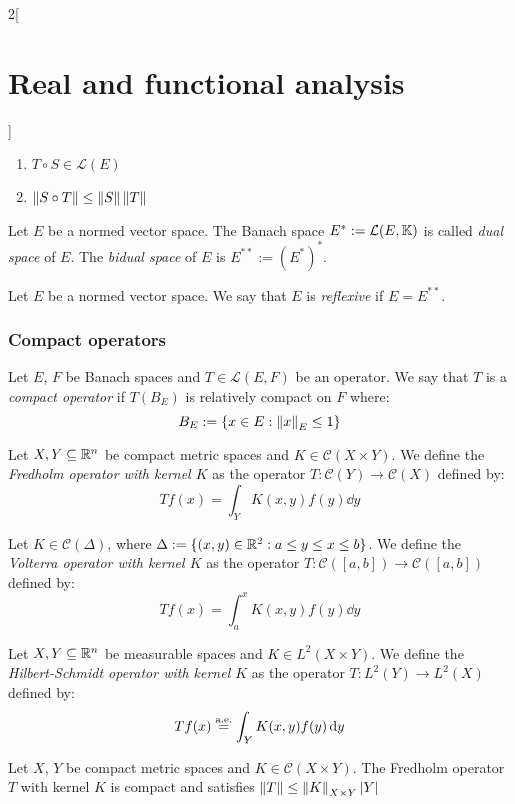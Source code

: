 \documentclass[../../../main_math.tex]{subfiles}
\begin{document}
\begin{multicols}{2}[\section{Real and functional analysis}]
\begin{definition}
    \begin{enumerate}
      \item $T\circ S\in\mathcal{L}(E)$
      \item $\left\|S\circ T\right\|\leq\left\|S\right\|\left\|T\right\|$
    \end{enumerate}
  \end{definition}
  \begin{definition}
    Let $E$ be a normed vector space. The Banach space $E^*:=\mathcal{L}(E,\mathbb{K})$ is called \emph{dual space} of $E$. The \emph{bidual space} of $E$ is $E^{**}:=(E^*)^*$.
  \end{definition}
  \begin{definition}
    Let $E$ be a normed vector space. We say that $E$ is \emph{reflexive} if $E=E^{**}$.
  \end{definition}
  \subsubsection{Compact operators}
  \begin{definition}
    Let $E$, $F$ be Banach spaces and $T\in\mathcal{L}(E,F)$ be an operator. We say that $T$ is a \emph{compact operator} if $T(B_E)$ is relatively compact on $F$ where: $$B_E:=\{x\in E:\left\|x\right\|_E\leq 1\}$$
  \end{definition}
  \begin{definition}
    Let $X,Y\subseteq \mathbb{R}^n$ be compact metric spaces and $K\in\mathcal{C}(X\times Y)$. We define the \emph{Fredholm operator with kernel $K$} as the operator $T:\mathcal{C}(Y)\rightarrow\mathcal{C}(X)$ defined by: $$Tf(x)=\int_YK(x,y)f(y)\dd{y}$$
  \end{definition}
  \begin{definition}
    Let $K\in\mathcal{C}(\Delta)$, where $\Delta:=\{(x,y)\in\mathbb{R}^2:a\leq y\leq x\leq b\}$. We define the \emph{Volterra operator with kernel $K$} as the operator $T:\mathcal{C}([a,b])\rightarrow\mathcal{C}([a,b])$ defined by: $$Tf(x)=\int_a^xK(x,y)f(y)\dd{y}$$
  \end{definition}
  \begin{definition}
    Let $X,Y\subseteq \mathbb{R}^n$ be measurable spaces and $K\in L^2(X\times Y)$. We define the \emph{Hilbert-Schmidt operator with kernel $K$} as the operator $T:L^2(Y)\rightarrow L^2(X)$ defined by: $$Tf(x)\overset{\text{a.e.}}{=}\int_YK(x,y)f(y)\dd{y}$$
  \end{definition}
  \begin{proposition}\label{RFA:fredholm}
    Let $X$, $Y$ be compact metric spaces and $K\in\mathcal{C}(X\times Y)$. The Fredholm operator $T$ with kernel $K$ is compact and satisfies $\left\|T\right\|\leq\left\|K\right\|_{X\times Y}\abs{Y}$

\end{proposition}
\end{multicols}
\end{document}
